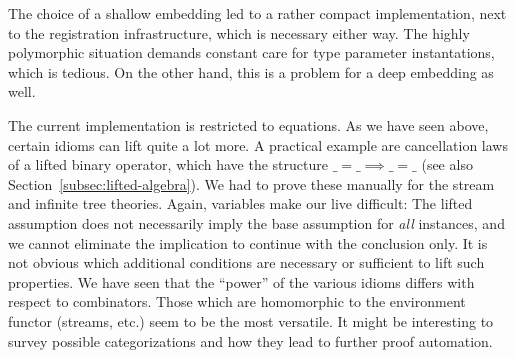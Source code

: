 The choice of a shallow embedding led to a rather compact implementation,
next to the registration infrastructure, which is necessary either way.
The highly polymorphic situation demands constant care for type parameter
instantations, which is tedious.
On the other hand, this is a problem for a deep embedding as well.

The current implementation is restricted to equations.
As we have seen above, certain idioms can lift quite a lot more.
A practical example are cancellation laws of a lifted binary operator, which
have the structure $\_ = \_ \implies \_ = \_$ (see also
Section~\ref{subsec:lifted-algebra}).
We had to prove these manually for the stream and infinite tree theories.
Again, variables make our live difficult:
The lifted assumption does not necessarily imply the base assumption for
\emph{all} instances, and we cannot eliminate the implication to continue
with the conclusion only.
It is not obvious which additional conditions are necessary or sufficient to
lift such properties.
We have seen that the ``power'' of the various idioms differs with respect to
combinators.
Those which are homomorphic to the environment functor (streams, etc.) seem to
be the most versatile.
It might be interesting to survey possible categorizations and how they lead
to further proof automation.
